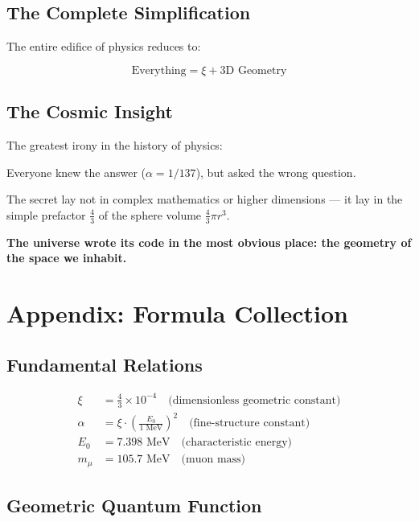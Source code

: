 	\subsection{The Complete Simplification}
	
	The entire edifice of physics reduces to:
	
	\begin{equation}
		\boxed{\text{Everything} = \xi + \text{3D Geometry}}
	\end{equation}
	
	\subsection{The Cosmic Insight}
	
	\begin{tcolorbox}[colback=red!5!white,colframe=red!75!black,title=Insight]
		The greatest irony in the history of physics:
		
		Everyone knew the answer ($\alpha = 1/137$), but asked the wrong question.
		
		The secret lay not in complex mathematics or higher dimensions — it lay in the simple prefactor $\frac{4}{3}$ of the sphere volume $\frac{4}{3}\pi r^3$.
		
		\textbf{The universe wrote its code in the most obvious place: the geometry of the space we inhabit.}
	\end{tcolorbox}
	
	\section{Appendix: Formula Collection}
	
	\subsection{Fundamental Relations}
	
	\begin{align}
		\xi &= \frac{4}{3} \times 10^{-4} \quad \text{(dimensionless geometric constant)}\\
		\alpha &= \xi \cdot \left(\frac{E_0}{1 \text{ MeV}}\right)^2 \quad \text{(fine-structure constant)}\\
		E_0 &= 7.398 \text{ MeV} \quad \text{(characteristic energy)}\\
		m_\mu &= 105.7 \text{ MeV} \quad \text{(muon mass)}
	\end{align}
	
	\subsection{Geometric Quantum Function}
	
